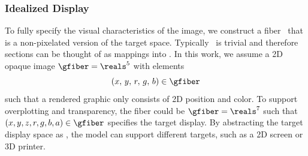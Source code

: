 \documentclass[../main.tex]{subfiles}
\begin{document}
\subsubsection{Idealized Display \gfiber}
\label{sec:math:graphic:fiber}
To fully specify the visual characteristics of the image, we construct a fiber \gfiber\ that is a non-pixelated version of the target space. Typically \gtotal\ is trivial and therefore sections can be thought of as mappings into \gfiber. In this work, we assume a 2D opaque image $\gfiber=\reals^5$ with elements 
\begin{equation*}
(x,\, y,\, r,\, g,\, b) \in \gfiber
\end{equation*}
such that a rendered graphic only consists of 2D position and color. To support overplotting and transparency, the fiber could be $\gfiber=\reals^{7}$ such that $(x, y, z, r, g, b, a) \in \gfiber$ specifies the target display. By abstracting the target display space as \gfiber, the model can support different targets, such as a 2D screen or 3D printer. 
\end{document}
